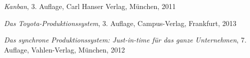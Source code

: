 \newpage
{}
  \begin{thebibliography}{}



%

	 {\sl Kanban}, 3. Auflage, Carl Hanser Verlag, München, 2011

	
	 {\sl Das Toyota-Produktionssystem}, 3. Auflage, Campus-Verlag, Frankfurt, 2013

	 {\sl Das synchrone Produktionssystem: Just-in-time für das ganze Unternehmen}, 7. Auflage, Vahlen-Verlag, München, 2012


\end{thebibliography}
